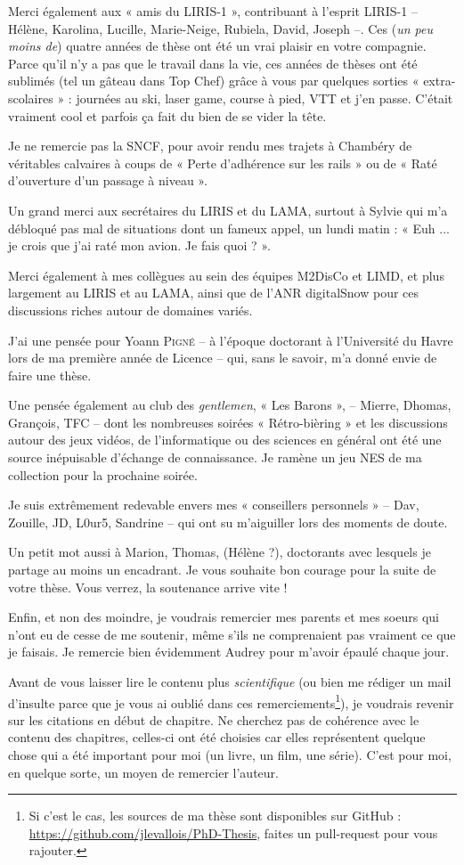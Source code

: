 Merci également aux « amis du LIRIS-1 », contribuant à l'esprit LIRIS-1 --
Hélène, Karolina, Lucille, Marie-Neige, Rubiela, David, Joseph --. Ces (\emph{un
peu moins de}) quatre années de thèse ont été un vrai plaisir en votre
compagnie. Parce qu'il n'y a pas que le travail dans la vie, ces années de
thèses ont été sublimés (tel un gâteau dans Top Chef) grâce à vous par quelques
sorties « extra-scolaires » : journées au ski, laser game, course à pied, VTT et
j'en passe. C'était vraiment cool et parfois ça fait du bien de se vider la
tête.

Je ne remercie pas la SNCF, pour avoir rendu mes trajets à Chambéry de
véritables calvaires à coups de « Perte d'adhérence sur les rails » ou de «
Raté d'ouverture d'un passage à niveau ».

Un grand merci aux secrétaires du LIRIS et du LAMA, surtout à Sylvie qui m'a
débloqué pas mal de situations dont un fameux appel, un lundi matin : «
Euh ... je crois que j'ai raté mon avion. Je fais quoi ? ».

Merci également à mes collègues au sein des équipes M2DisCo et LIMD, et plus
largement au LIRIS et au LAMA, ainsi que de l'ANR digitalSnow pour ces
discussions riches autour de domaines variés.

J'ai une pensée pour Yoann \textsc{Pigné} -- à l'époque doctorant à l'Université
du Havre lors de ma première année de Licence -- qui, sans le savoir, m'a donné
envie de faire une thèse.

Une pensée également au club des \emph{gentlemen}, « Les Barons », -- Mierre,
Dhomas, Grançois, TFC -- dont les nombreuses soirées « Rétro-bièring » et les
discussions autour des jeux vidéos, de l'informatique ou des sciences en général
ont été une source inépuisable d'échange de connaissance. Je ramène un jeu NES
de ma collection pour la prochaine soirée.

Je suis extrêmement redevable envers mes « conseillers personnels » -- Dav,
 Zouille, JD, L0ur5, Sandrine -- qui ont su m'aiguiller lors des
moments de doute.

Un petit mot aussi à Marion, Thomas, (Hélène ?), doctorants avec lesquels je
partage au moins un encadrant. Je vous souhaite bon courage pour la suite de
votre thèse. Vous verrez, la soutenance arrive vite !

Enfin, et non des moindre, je voudrais remercier mes parents et mes soeurs qui
n'ont eu de cesse de me soutenir, même s'ils ne comprenaient pas vraiment ce que
je faisais. Je remercie bien évidemment Audrey pour m'avoir épaulé chaque jour.

Avant de vous laisser lire le contenu plus \emph{scientifique} (ou bien me
rédiger un mail d'insulte parce que je vous ai oublié dans ces
remerciements\footnote{Si c'est le cas, les sources de ma thèse sont disponibles
sur GitHub : \url{https://github.com/jlevallois/PhD-Thesis}, faites un
pull-request pour vous rajouter.}), je voudrais revenir sur les citations en
début de chapitre. Ne cherchez pas de cohérence avec le contenu des chapitres,
celles-ci ont été choisies car elles représentent quelque chose qui a été
important pour moi (un livre, un film, une série). C'est pour moi, en quelque
sorte, un moyen de remercier l'auteur.
